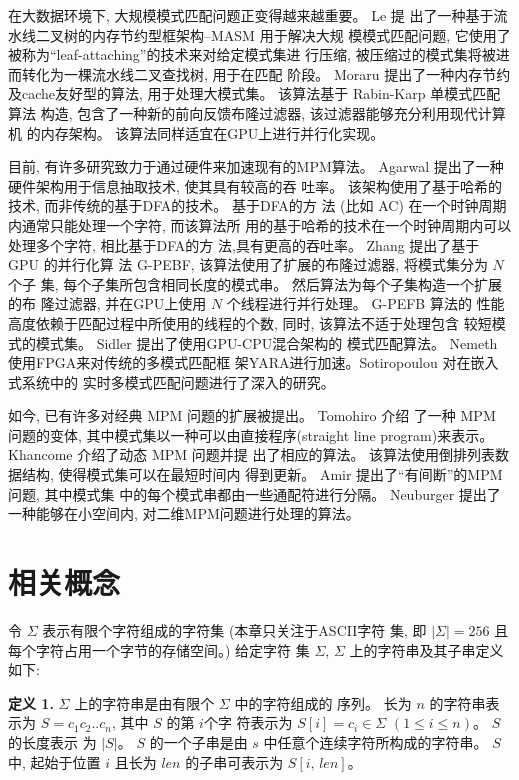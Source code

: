 在大数据环境下, 大规模模式匹配问题正变得越来越重要。 Le \cite{Le2013}提
出了一种基于流水线二叉树的内存节约型框架构--\textsf{MASM} 用于解决大规
模模式匹配问题, 它使用了被称为“leaf-attaching”的技术来对给定模式集进
行压缩, 被压缩过的模式集将被进而转化为一棵流水线二叉查找树, 用于在匹配
阶段。 Moraru \cite{Moraru2012} 提出了一种内存节约及cache友好型的算法,
用于处理大模式集。 该算法基于 Rabin-Karp \cite{Karp1987} 单模式匹配算法
构造, 包含了一种新的前向反馈布隆过滤器, 该过滤器能够充分利用现代计算机
的内存架构。 该算法同样适宜在GPU上进行并行化实现。

目前, 有许多研究致力于通过硬件来加速现有的MPM算法。 Agarwal
\cite{Agarwal2013} 提出了一种硬件架构用于信息抽取技术, 使其具有较高的吞
吐率。 该架构使用了基于哈希的技术, 而非传统的基于DFA的技术。 基于DFA的方
法 (比如 \textsf{AC}) 在一个时钟周期内通常只能处理一个字符, 而该算法所
用的基于哈希的技术在一个时钟周期内可以处理多个字符, 相比基于DFA的方
法,具有更高的吞吐率。 Zhang \cite{Zhang2015} 提出了基于 GPU 的并行化算
法 \textsf{G-PEBF}, 该算法使用了扩展的布隆过滤器, 将模式集分为 $N$ 个子
集, 每个子集所包含相同长度的模式串。 然后算法为每个子集构造一个扩展的布
隆过滤器, 并在GPU上使用 $N$ 个线程进行并行处理。 \textsf{G-PEFB} 算法的
性能高度依赖于匹配过程中所使用的线程的个数, 同时, 该算法不适于处理包含
较短模式的模式集。 Sidler \cite{Sidler2017} 提出了使用GPU-CPU混合架构的
模式匹配算法。 Nemeth \cite{Nemeth2016} 使用FPGA来对传统的多模式匹配框
架YARA进行加速。Sotiropoulou \cite{Sotiropoulou2017} 对在嵌入式系统中的
实时多模式匹配问题进行了深入的研究。

如今, 已有许多对经典 MPM 问题的扩展被提出。 Tomohiro \cite{I2015} 介绍
了一种 MPM 问题的变体, 其中模式集以一种可以由直接程序(straight line
program)来表示。  Khancome \cite{Khancome2013} 介绍了动态 MPM 问题并提
出了相应的算法。 该算法使用倒排列表数据结构, 使得模式集可以在最短时间内
得到更新。 Amir \cite{Amir2015} 提出了“有间断”的MPM 问题, 其中模式集
中的每个模式串都由一些通配符进行分隔。 Neuburger \cite{Neuburger2012}
提出了一种能够在小空间内, 对二维MPM问题进行处理的算法。

\section{相关概念}
\label{sec:notations}

令 $\Sigma$ 表示有限个字符组成的字符集 (本章只关注于ASCII字符
集, 即 $|\Sigma| = 256$ 且每个字符占用一个字节的存储空间。)  给定字符
集 $\Sigma$, $\Sigma$ 上的字符串及其子串定义如下:

\textbf{定义 1.}  $\Sigma$ 上的字符串是由有限个 $\Sigma$ 中的字符组成的
序列。 长为 $n$ 的字符串表示为 $S = c_1c_2..c_n$, 其中 $S$ 的第 $i$个字
符表示为 $S[i] = c_i \in \Sigma$ $(1 \leq i \leq n)$。  $S$ 的长度表示
为 $|S|$。 $S$ 的一个子串是由 $s$ 中任意个连续字符所构成的字符串。  $S$中,
起始于位置 $i$ 且长为 $len$ 的子串可表示为 $S[i,\,len]$。

